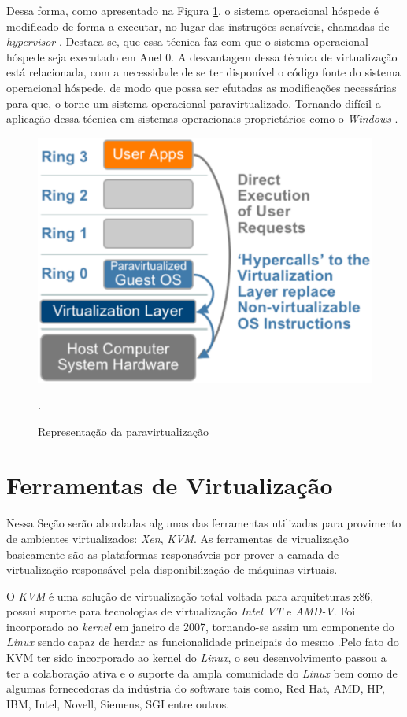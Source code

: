 Dessa forma, como apresentado na Figura \ref{paravirtualization}, o sistema operacional hóspede é modificado de forma a executar, no lugar das instruções sensíveis, chamadas de \textit{hypervisor} \cite{tanembaum}. Destaca-se, que essa técnica faz com que o sistema operacional hóspede seja executado em Anel 0. A desvantagem dessa técnica de virtualização está relacionada, com a necessidade de se ter disponível o código fonte do sistema operacional hóspede, de modo que possa ser efutadas as modificações necessárias para que, o torne um sistema operacional paravirtualizado. Tornando difícil a aplicação dessa técnica em sistemas operacionais proprietários como o \textit{Windows} \cite{tanembaum}.
\begin{figure}[!htb]
\centering
\includegraphics [keepaspectratio=true,scale=0.3]{figuras/paravirtualization2.eps}
\caption{Representação da paravirtualização}
\cite{vmware}.
\label{paravirtualization}
\end{figure}

\section{Ferramentas de Virtualização}
Nessa Seção serão abordadas algumas das ferramentas utilizadas para provimento de ambientes virtualizados: \textit{Xen}, \textit{KVM}. As ferramentas de virualização basicamente são as plataformas responsáveis por prover a camada de virtualização responsável pela disponibilização de máquinas virtuais.

O \textit{KVM} é uma solução de virtualização total voltada para arquiteturas x86, possui suporte para tecnologias de virtualização \textit{Intel VT} e \textit{AMD-V}. Foi incorporado ao \textit{kernel} em janeiro de 2007, tornando-se assim um componente do \textit{Linux} sendo capaz de herdar as funcionalidade principais do mesmo \cite{redhatkvm,qumranet}.Pelo fato do KVM ter sido incorporado ao kernel do \textit{Linux}, o seu desenvolvimento passou a ter a colaboração ativa e o suporte da ampla comunidade do \textit{Linux} bem como de algumas fornecedoras da indústria do software tais como, Red Hat, AMD, HP, IBM, Intel, Novell, Siemens, SGI entre outros\cite {redhatkvm}.

